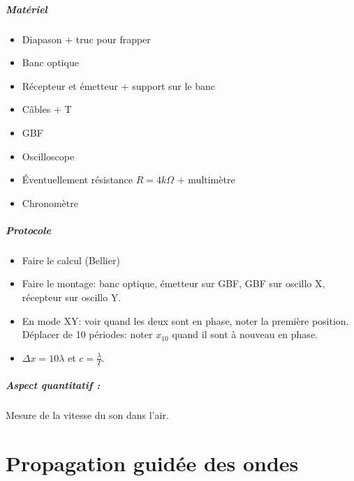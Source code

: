 \documentclass[11pt]{report}
\numberwithin{figure}{section}
\numberwithin{equation}{section}
\numberwithin{table}{section}
\newcommand{\1}{\boldsymbol{1}}
\begin{document}
\begin{tcolorbox}[breakable, enhanced, colback=red!2!white,colframe=mycolor!85!black,title=\textbf{\textbf{Expérience}}]
\paragraph*{Matériel}
\begin{itemize}
\item Diapason + truc pour frapper
\item Banc optique
\item Récepteur et émetteur + support sur le banc
\item Câbles + T
\item GBF
\item Oscilloscope
\item Éventuellement résistance $R=4k\Omega$ + multimètre
\item Chronomètre
\end{itemize}

\paragraph*{Protocole } 

\begin{itemize}[label=$\triangleright$]
		\item Faire le calcul (Bellier)
		\item Faire le montage: banc optique, émetteur sur GBF, GBF sur oscillo X, récepteur sur oscillo Y.
		\item En mode XY: voir quand les deux sont en phase, noter la première position. Déplacer de 10 périodes: noter $x_10$ quand il sont à nouveau en phase.
		\item $\Delta x = 10 \lambda$ et $c = \frac{\lambda}{T}$.
\end{itemize}

\paragraph*{Aspect quantitatif :} Mesure de la vitesse du son dans l'air.


\end{tcolorbox}


\newpage



\chapter{Propagation guidée des ondes}
\end{document}
